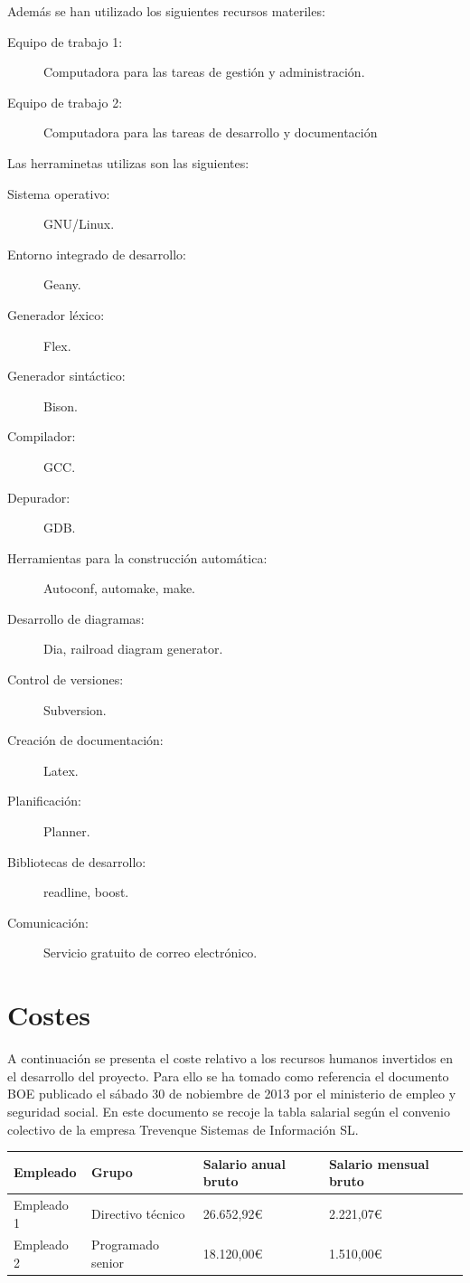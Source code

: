Además se han utilizado los siguientes recursos materiles:
\begin{description}
\item [Equipo de trabajo 1:] Computadora para las tareas de gestión y administración. 
\item [Equipo de trabajo 2:] Computadora para las tareas de desarrollo y documentación
\end{description}

Las herraminetas utilizas son las siguientes:
\begin{description}
\item [Sistema operativo:] GNU/Linux. 
\item [Entorno integrado de desarrollo:] Geany.
\item [Generador léxico:] Flex.
\item [Generador sintáctico:] Bison.
\item [Compilador:] GCC.
\item [Depurador:] GDB.
\item [Herramientas para la construcción automática:] Autoconf, automake, make.
\item [Desarrollo de diagramas:] Dia, railroad diagram generator.
\item [Control de versiones:] Subversion.
\item [Creación de documentación:] Latex.
\item [Planificación:] Planner.
\item [Bibliotecas de desarrollo:] readline, boost. 
\item [Comunicación:] Servicio gratuito de correo electrónico. 
\end{description}

\section{Costes}
A continuación se presenta el coste relativo a los recursos humanos invertidos en el desarrollo del 
proyecto. Para ello se ha tomado como referencia el documento BOE publicado el sábado 30 de nobiembre de 2013
por el ministerio de empleo y seguridad social. En este documento se recoje la tabla salarial según
el convenio colectivo de la empresa Trevenque Sistemas de Información SL.

\begin{tabular}{|l|l|l|l|} \hline
\textbf{Empleado} & \textbf{Grupo} & \textbf{Salario anual bruto} & \textbf{Salario mensual bruto}  \\ \hline
Empleado 1 & Directivo técnico & 26.652,92€ & 2.221,07€  \\ \hline
Empleado 2 & Programado senior & 18.120,00€ & 1.510,00€ \\ \hline
\end{tabular}

